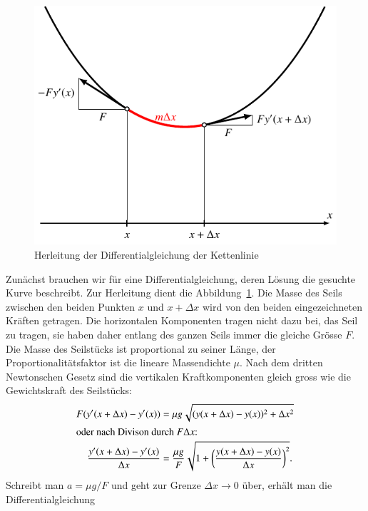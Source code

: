 \begin{loesung}
\def\asinh{\operatorname{asinh}}
\begin{figure}
\centering
\includegraphics{chapters/50-ode/figures/kettenlinie.pdf}
\caption{Herleitung der Differentialgleichung der Kettenlinie
\label{numerik:kettenlinie}}
\end{figure}
Zunächst brauchen wir für eine Differentialgleichung, deren Lösung die
gesuchte Kurve beschreibt.
Zur Herleitung dient die Abbildung~\ref{numerik:kettenlinie}.
Die Masse des Seils zwischen den beiden Punkten $x$ und $x+\Delta x$
wird von den beiden eingezeichneten Kräften getragen.
Die horizontalen Komponenten tragen nicht dazu bei, das Seil zu
tragen, sie haben daher entlang des ganzen Seils immer die gleiche
Grösse $F$.
Die Masse des Seilstücks ist proportional zu seiner Länge,
der Proportionalitätsfaktor ist die lineare Massendichte $\mu$.
Nach dem dritten Newtonschen Gesetz
sind die vertikalen Kraftkomponenten gleich gross wie die Gewichtskraft
des Seilstücks:
\begin{align*}
F(y'(x+\Delta x)-y'(x))
&= \mu g\sqrt{(y(x+\Delta x)-y(x))^2+\Delta x^2}
\\
\intertext{oder nach Divison durch $F\Delta x$:}
\frac{y'(x+\Delta x)-y'(x)}{\Delta x}
&=\frac{\mu g}{F}\sqrt{1+\biggl(\frac{y(x+\Delta x)-y(x)}{\Delta x}\biggr)^2}.
\end{align*}
Schreibt man $a=\mu g/F$ und geht zur Grenze $\Delta x\to 0$ über,
erhält man die Differentialgleichung
\begin{equation}

\end{equation}
\end{loesung}

